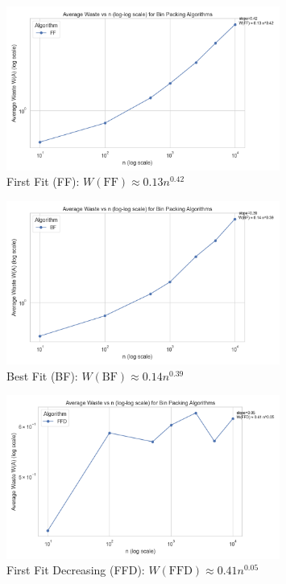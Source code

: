 \documentclass[12pt]{article}
\begin{document}
\begin{figure}[h!]
    \centering
    \includegraphics[width=0.8\textwidth]{waste_loglog_FF.png}
    \caption{First Fit (FF): $W(\text{FF}) \approx 0.13 n^{0.42}$}
\end{figure}

\begin{figure}[h!]
    \centering
    \includegraphics[width=0.8\textwidth]{waste_loglog_BF.png}
    \caption{Best Fit (BF): $W(\text{BF}) \approx 0.14 n^{0.39}$}
\end{figure}

\begin{figure}[h!]
    \centering
    \includegraphics[width=0.8\textwidth]{waste_loglog_FFD.png}
    \caption{First Fit Decreasing (FFD): $W(\text{FFD}) \approx 0.41 n^{0.05}$}
\end{figure}
\end{document}
